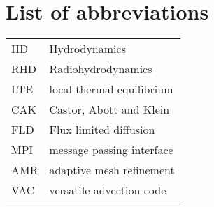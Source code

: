 \chapter*{List of abbreviations}
\begin{multicols}{2}
\begin{tabular}{ll}
HD     & Hydrodynamics             \\
RHD    & Radiohydrodynamics        \\
LTE    & local thermal equilibrium \\
CAK    & Castor, Abott and Klein   \\
FLD    & Flux limited diffusion    \\
MPI    & message passing interface \\
AMR    & adaptive mesh refinement  \\
VAC    & versatile advection code  \\
\end{tabular}
\end{multicols}

